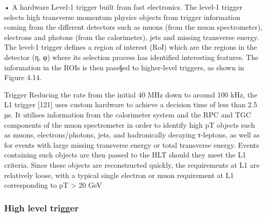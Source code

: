 • A hardware Level-1 trigger built from fast electronics. The level-1 trigger selects high transverse momentum physics objects from trigger information coming from the different detectors such as muons (from the muon spectrometer), electrons and photons (from the calorimeter), jets and missing transverse energy. The level-1 trigger defines a region of interest (RoI) which are the regions in the detector (η, φ) where its selection process has identified interesting features. The information in the ROIs is then pass§ed to higher-level triggers, as shown in Figure 4.14. 

Trigger Reducing the rate from the initial 40 MHz down to around 100 kHz, the L1 trigger [121] uses custom hardware to achieve a decision time of less than 2.5 µs. It utilises information from the calorimeter system and the RPC and TGC components of the muon spectrometer in order to identify high pT objects such as muons, electrons/photons, jets, and hadronically decaying τ-leptons, as well as for events with large missing transverse energy or total transverse energy. Events containing such objects are then passed to the HLT should they meet the L1 criteria. Since these objects are reconstructed quickly, the requirements at L1 are relatively loose, with a typical single electron or muon requirement at L1 corresponding to pT > 20 GeV 
\subsubsection{High level trigger}